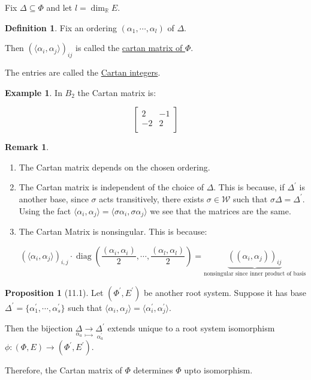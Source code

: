 \documentclass{article}
\theoremstyle{definition}
\newtheorem*{example}{Example}
\newtheorem*{definition}{Definition}
\newtheorem{proposition}[theorem]{Proposition}
\newtheorem*{remark}{Remark}
\begin{document}
Fix \(\Delta \subseteq \Phi\) and let \(l = \dim_\mathbb{R} E\).

\begin{definition}
    Fix an ordering \((\alpha_1, \cdots , \alpha_l)\) of \(\Delta\).
    
    Then \((\langle \alpha_i, \alpha_j \rangle)_{ij}\) is called the \underline{cartan matrix of \(\Phi\)}.
    
    The entries are called the \underline{Cartan integers}.

\end{definition}

\begin{example}
    In \(B_2\) the Cartan matrix is:

    \[
        \begin{bmatrix}
            2 &  -1 \\
            -2 &  2 \\
        \end{bmatrix}
    \]
\end{example}

\begin{remark}
    \begin{enumerate}[label=\arabic*)]
        \item The Cartan matrix depends on the chosen ordering.
        \item The Cartan matrix is independent of the choice of \(\Delta\). This is because, if \(\Delta^{\prime}\) is another base, since \(\sigma\) acts transitively, there exists \(\sigma \in \mathcal{W}\) such that \(\sigma \Delta = \Delta^{\prime}\). Using the fact \(\langle \alpha_i, \alpha_j \rangle = \langle \sigma \alpha_i, \sigma \alpha_j \rangle \) we see that the matrices are the same.
        \item The Cartan Matrix is nonsingular. This is because:
        
        \[
            (\langle \alpha_i, \alpha_j \rangle)_{i,j} \cdot \operatorname{diag}\left( \frac{(\alpha_i, \alpha_i)}{2}, \cdots , \frac{(\alpha_l, \alpha_l)}{2} \right) = \underbrace{((\alpha_i, \alpha_j))_{ij}}_{\text{nonsingular since inner product of basis}}  
        \]
    \end{enumerate} 
\end{remark}

\begin{proposition}[11.1]
    Let \((\Phi^{\prime} , E^{\prime})\) be another root system. Suppose it has base \(\Delta^{\prime} = \{ \alpha_1^{\prime} , \cdots , \alpha_s^{\prime} \}\) such that \(\langle \alpha_i, \alpha_j \rangle = \langle \alpha_i^{\prime} , \alpha_j^{\prime} \rangle\).

    Then the bijection \(\underset{\alpha_a}{\Delta} \underset{\mapsto}{\to} \underset{\alpha_a^{\prime}}{\Delta ^{\prime} } \) extends unique to a root system isomorphism \(\phi : (\Phi , E) \to (\Phi ^{\prime} , E^{\prime} )\).

    Therefore, the Cartan matrix of \(\Phi\) determines \(\Phi\) upto isomorphism.
\end{proposition}
\end{document}
